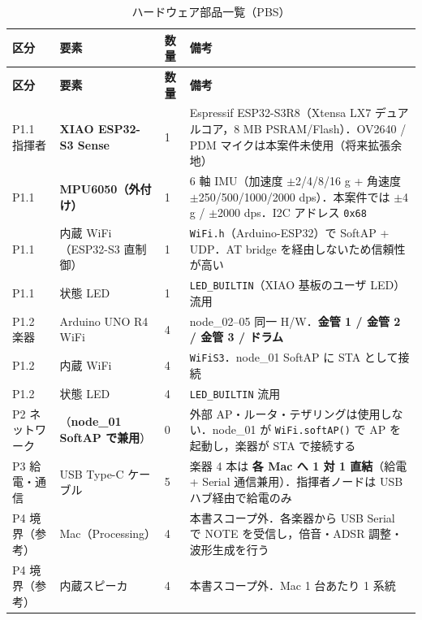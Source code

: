 \documentclass[lualatex,book,paper=a4paper,jafontsize=11.5pt,jafontscale=1.05]{jlreq}
\begin{document}
\begin{longtable}{p{} p{} p{} p{}}
\caption{ハードウェア部品一覧（PBS）}\label{tab:hw-pbs}\\
\toprule
\textbf{区分} & \textbf{要素} & \textbf{数量} & \textbf{備考} \\
\midrule
\endfirsthead
\toprule
\textbf{区分} & \textbf{要素} & \textbf{数量} & \textbf{備考} \\
\midrule
\endhead
P1.1 指揮者     & \textbf{XIAO ESP32-S3 Sense}  & 1 & Espressif ESP32-S3R8（Xtensa LX7 デュアルコア，8 MB PSRAM/Flash）．OV2640 / PDM マイクは本案件未使用（将来拡張余地） \\
P1.1            & \textbf{MPU6050（外付け）}   & 1 & 6 軸 IMU（加速度 $\pm$2/4/8/16 g + 角速度 $\pm$250/500/1000/2000 dps）．本案件では $\pm$4 g / $\pm$2000 dps．I2C アドレス \texttt{0x68} \\
P1.1            & 内蔵 WiFi（ESP32-S3 直制御）  & 1 & \texttt{WiFi.h}（Arduino-ESP32）で SoftAP + UDP．AT bridge を経由しないため信頼性が高い \\
P1.1            & 状態 LED                  & 1 & \texttt{LED\_BUILTIN}（XIAO 基板のユーザ LED）流用 \\
P1.2 楽器       & Arduino UNO R4 WiFi      & 4 & node\_02--05 同一 H/W．\textbf{金管 1 / 金管 2 / 金管 3 / ドラム} \\
P1.2            & 内蔵 WiFi                 & 4 & \texttt{WiFiS3}．node\_01 SoftAP に STA として接続 \\
P1.2            & 状態 LED                  & 4 & \texttt{LED\_BUILTIN} 流用 \\
P2 ネットワーク & （\textbf{node\_01 SoftAP で兼用}） & 0 & 外部 AP・ルータ・テザリングは使用しない．node\_01 が \texttt{WiFi.softAP()} で AP を起動し，楽器が STA で接続する \\
P3 給電・通信   & USB Type-C ケーブル       & 5 & 楽器 4 本は \textbf{各 Mac へ 1 対 1 直結}（給電 + Serial 通信兼用）．指揮者ノードは USB ハブ経由で給電のみ \\
P4 境界（参考） & Mac（Processing）         & 4 & 本書スコープ外．各楽器から USB Serial で NOTE を受信し，倍音・ADSR 調整・波形生成を行う \\
P4 境界（参考） & 内蔵スピーカ              & 4 & 本書スコープ外．Mac 1 台あたり 1 系統 \\
\bottomrule
\end{longtable}
\end{document}
